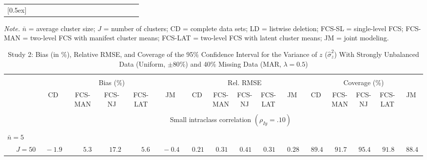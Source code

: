 \begin{sidewaystable}
\begin{threeparttable}
\begin{tabular}{llccccccccccccccc}
[0.5ex]\hline\\[-1.6ex] 
\end{tabular}
\begin{tablenotes}{\footnotesize \textit{Note.} $\bar{n}$ = average cluster size; $J$ = number of clusters; CD = complete data sets; LD = listwise deletion; FCS-SL = single-level FCS; FCS-MAN = two-level FCS with manifest cluster means; FCS-LAT = two-level FCS with latent cluster means; JM = joint modeling.}\end{tablenotes}
\end{threeparttable}
\end{sidewaystable}
\begin{sidewaystable}
\begin{threeparttable}
\setlength{\tabcolsep}{1.0pt}
\renewcommand{\arraystretch}{0.95}
\footnotesize
\caption{\small Study 2: Bias (in \%), Relative RMSE, and Coverage of the 95\% Confidence Interval for the Variance of $z$ ($\hat\sigma_z^2$) With Strongly Unbalanced Data (Uniform, $\pm 80\%$) and 40\% Missing Data (MAR, $\lambda=0.5$)}
\begin{tabular}{llccccccccccccccc}
\hline\\[-1.8ex]
& & \multicolumn{5}{c}{Bias (\%)} & \multicolumn{5}{c}{Rel. RMSE} & \multicolumn{5}{c}{Coverage (\%)} \\ \cmidrule(r){3-7}\cmidrule(r){8-12}\cmidrule(r){13-17}
 &  & CD & \makecell{FCS-\\MAN} & \makecell{FCS-\\NJ} & \makecell{FCS-\\LAT} & JM & CD & \makecell{FCS-\\MAN} & \makecell{FCS-\\NJ} & \makecell{FCS-\\LAT} & JM & CD & \makecell{FCS-\\MAN} & \makecell{FCS-\\NJ} & \makecell{FCS-\\LAT} & \multicolumn{1}{c}{JM} \\ 
[0.4ex]\hline\\[-1.8ex]
& & \multicolumn{15}{c}{Small intraclass correlation $(\rho_{Iy}=.10)$} \\[0.6ex]\hline\\[-1.8ex]
\multicolumn{4}{l}{$\bar{n}=5$} \\  & \nopagebreak $\;J=50$  & $\phantom{0}{-}1.9\phantom{0}$ & $\phantom{0}\phantom{-}5.3\phantom{0}$ & $\phantom{-}17.2\phantom{0}$ & $\phantom{0}\phantom{-}5.6\phantom{0}$ & $\phantom{0}{-}0.4\phantom{0}$ & $\phantom{0}0.21\phantom{0}$ & $\phantom{0}0.31\phantom{0}$ & $\phantom{0}0.41\phantom{0}$ & $\phantom{0}0.31\phantom{0}$ & $\phantom{0}0.28\phantom{0}$ & $\phantom{0}89.4\phantom{0}$ & $\phantom{0}91.7\phantom{0}$ & $\phantom{0}95.4\phantom{0}$ & $\phantom{0}91.8\phantom{0}$ & $\phantom{0}88.4\phantom{0}$ \\

\end{tabular}
\end{threeparttable}
\end{sidewaystable}
